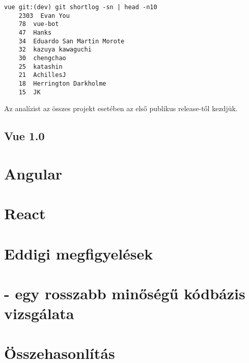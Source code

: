 \begin{lstlisting}
vue git:(dev) git shortlog -sn | head -n10
    2303  Evan You
    78  vue-bot
    47  Hanks
    34  Eduardo San Martin Morote
    32  kazuya kawaguchi
    30  chengchao
    25  katashin
    21  AchillesJ
    18  Herrington Darkholme
    15  JK
\end{lstlisting}

Az analízist az összes projekt esetében az első publikus release-től kezdjük.

\subsection{Vue 1.0}


\section{Angular}

\section{React}

\section{Eddigi megfigyelések}

\section{ - egy rosszabb minőségű kódbázis vizsgálata}

\section{Összehasonlítás}